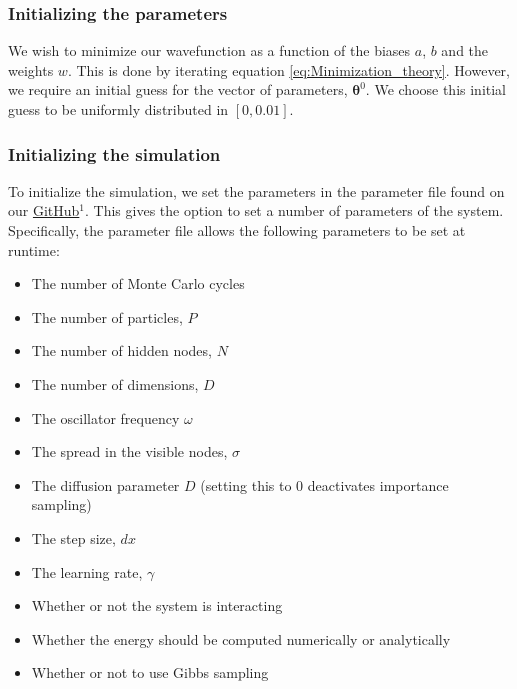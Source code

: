 \documentclass[a4paper, 10pt]{article}
\begin{document}
	\subsubsection{Initializing the parameters}
	We wish to minimize our wavefunction as a function of the biases $a$, $b$ and  the weights $w$. This is done by iterating equation \ref{eq:Minimization_theory}. However, we require an initial guess for the vector of parameters, $\boldsymbol{\theta}^0$. We choose this initial guess to be uniformly distributed in $[0, 0.01]$.
	\subsubsection{Initializing the simulation}
	To initialize the simulation, we set the parameters in the parameter file found on our \href{https://github.com/dulte/FYS4411/tree/master/Project2}{GitHub}$^1$. This gives the option to set a number of parameters of the system. Specifically, the parameter file allows the following parameters to be set at runtime:
	\begin{itemize}
	\item The number of Monte Carlo cycles
	\item The number of particles, $P$
	\item The number of hidden nodes, $N$
	\item The number of dimensions, $D$
	\item The oscillator frequency $\omega$
	\item The spread in the visible nodes, $\sigma$
	\item The diffusion parameter $D$ (setting this to $0$ deactivates importance sampling)
	\item The step size, $dx$
	\item The learning rate, $\gamma$
	\item Whether or not the system is interacting
	\item Whether the energy should be computed numerically or analytically
	\item Whether or not to use Gibbs sampling
	\end{itemize}
\end{document}

